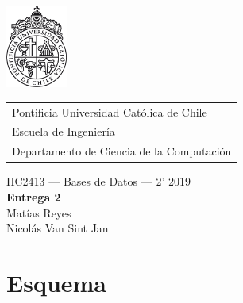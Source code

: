 \documentclass{article}
\begin{document}
\includegraphics[width=2cm]{uc.png}
\vspace*{-1.9cm}

\hspace*{2.1cm}
 \begin{tabular}{l}
  \sc Pontificia Universidad Católica de Chile \\
  \sc Escuela de Ingeniería \\
  \sc Departamento de Ciencia de la Computación
 \end{tabular}
 \bigskip

\vspace*{5mm}
\begin{center}
{IIC2413 --- Bases de Datos --- 2' 2019} \\
\vspace{3mm}
{\Large\bf Entrega 2} \\
\vspace{2mm}
Matías Reyes \\
Nicolás Van Sint Jan
\end{center}

\section{Esquema}
\end{document}
